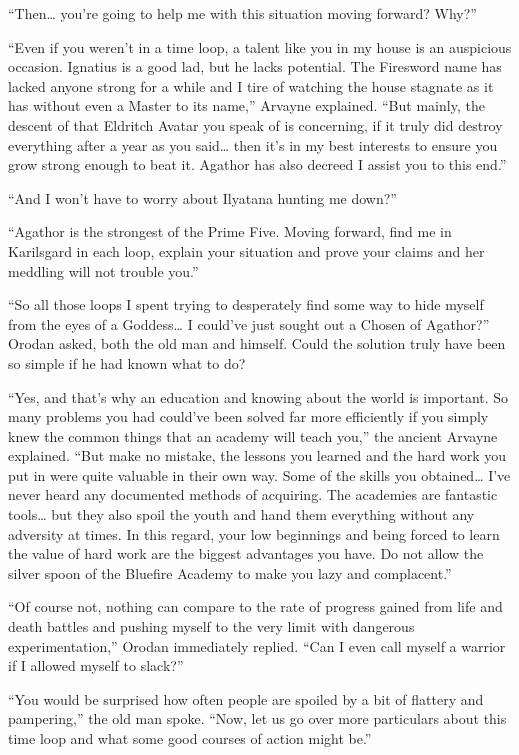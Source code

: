 \documentclass[a4paper,10pt]{book}
\begin{document}
“Then… you’re going to help me with this situation moving forward? Why?”\par
“Even if you weren’t in a time loop, a talent like you in my house is an auspicious occasion. Ignatius is a good lad, but he lacks potential. The Firesword name has lacked anyone strong for a while and I tire of watching the house stagnate as it has without even a Master to its name,” Arvayne explained. “But mainly, the descent of that Eldritch Avatar you speak of is concerning, if it truly did destroy everything after a year as you said… then it’s in my best interests to ensure you grow strong enough to beat it. Agathor has also decreed I assist you to this end.”\par
“And I won’t have to worry about Ilyatana hunting me down?”\par
“Agathor is the strongest of the Prime Five. Moving forward, find me in Karilsgard in each loop, explain your situation and prove your claims and her meddling will not trouble you.”\par
“So all those loops I spent trying to desperately find some way to hide myself from the eyes of a Goddess… I could’ve just sought out a Chosen of Agathor?” Orodan asked, both the old man and himself. Could the solution truly have been so simple if he had known what to do?\par
“Yes, and that’s why an education and knowing about the world is important. So many problems you had could’ve been solved far more efficiently if you simply knew the common things that an academy will teach you,” the ancient Arvayne explained. “But make no mistake, the lessons you learned and the hard work you put in were quite valuable in their own way. Some of the skills you obtained… I’ve never heard any documented methods of acquiring. The academies are fantastic tools… but they also spoil the youth and hand them everything without any adversity at times. In this regard, your low beginnings and being forced to learn the value of hard work are the biggest advantages you have. Do not allow the silver spoon of the Bluefire Academy to make you lazy and complacent.”\par
“Of course not, nothing can compare to the rate of progress gained from life and death battles and pushing myself to the very limit with dangerous experimentation,” Orodan immediately replied. “Can I even call myself a warrior if I allowed myself to slack?”\par
“You would be surprised how often people are spoiled by a bit of flattery and pampering,” the old man spoke. “Now, let us go over more particulars about this time loop and what some good courses of action might be.”\par
\end{document}
